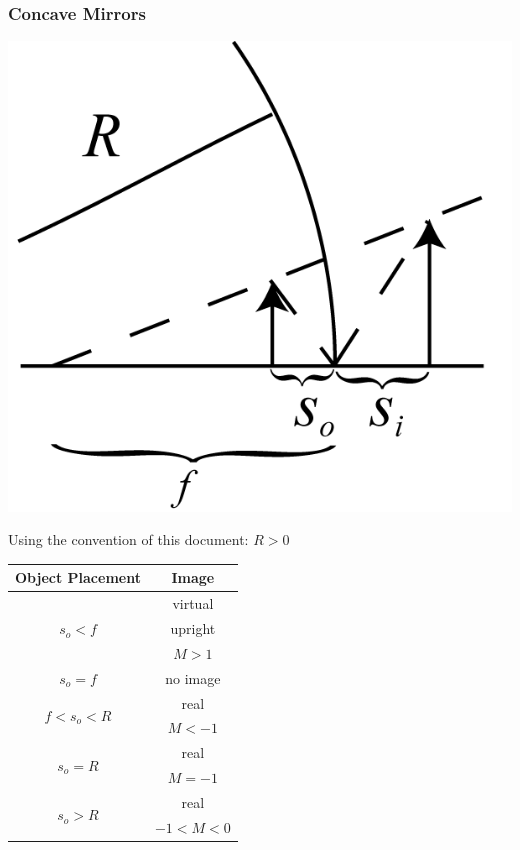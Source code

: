 \subsubsection{Concave Mirrors}
\begin{center}
\includegraphics[scale=0.6]{images/PGRE_Figures_3p2p2_Concave_Mirror.png}
\end{center}
Using the convention of this document: \(R>0\)
\begin{center}
  \begin{tabular}{ c | c  }
    Object Placement & Image \\ \hline%
    \multirow{3}{*}{ \(s_o<f\)} & virtual \\
    & upright \\
    & \(M>1\) \\ \hline
    \(s_o=f\) & no image \\ \hline
    \multirow{2}{*}{ \(f<s_o<R\)} & real \\
    & \(M<-1\) \\ \hline
    \multirow{2}{*}{  \(s_o=R\)} & real \\
    & \(M=-1\) \\ \hline
     \multirow{2}{*}{  \(s_o>R\)} & real \\
    & \(-1<M<0\) \\
    \hline
  \end{tabular}
\end{center}

